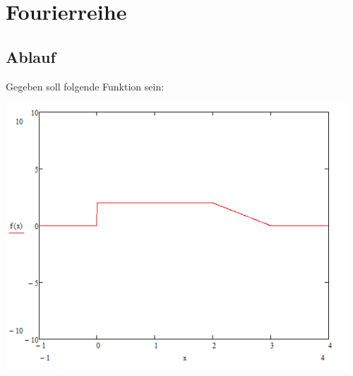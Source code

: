 \documentclass[a4paper,10pt]{article}
\begin{document}
\section{Fourierreihe}

\subsection{Ablauf}
Gegeben soll folgende Funktion sein:\\
\begin{center}
  \includegraphics[height=10cm]{BeispielGraph}
\end{center}
\end{document}
